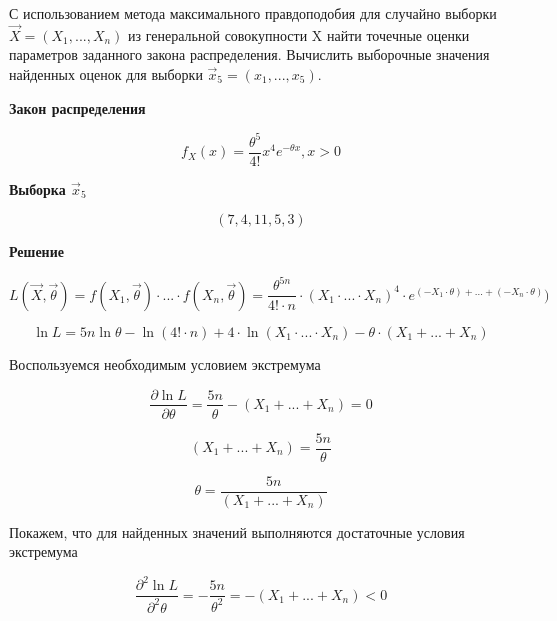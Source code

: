 \documentclass[12pt, a4paper]{report}
\begin{document}
	\hspace{1cm} С использованием метода максимального правдоподобия для случайно выборки $\vec{X} = (X_1, ..., X_n)$ из генеральной совокупности X найти точечные оценки параметров заданного закона распределения. Вычислить выборочные значения найденных оценок для выборки $\vec{x}_5 = (x_1, ..., x_5)$.
	
	\vspace{0.5cm}
	\textbf{Закон распределения}
	
	\begin{equation*}
	f_X(x) = \frac{\theta^5}{4!}  x^4  e^{-\theta x}, x > 0
	\end{equation*}
	
	\textbf{Выборка $\vec x_5$}
	
	\begin{equation*}
	(7, 4, 11, 5, 3)
	\end{equation*}
	
	\vspace{0.2cm}
	\textbf{Решение}
	
	\begin{equation*}
	L(\vec{X}, \vec{\theta}) = f(X_1, \vec{\theta}) \cdot ... \cdot f(X_n, \vec{\theta}) = \frac{\theta^{5n}}{4! \cdot n} \cdot (X_1 \cdot ... \cdot X_n)^4 \cdot e^{(-X_1 \cdot \theta)  + ... +(-X_n \cdot \theta) } )
	\end{equation*}
	
	\begin{equation*}
	\ln{L} = 5n \ln{\theta} - \ln{(4! \cdot n)} +  4 \cdot \ln{(X_1 \cdot ... \cdot X_n)} - \theta \cdot (X_1 + ... + X_n)
	\end{equation*}
	
	Воспользуемся необходимым условием экстремума
	
	\begin{equation*}
	\frac{\partial \ln L}{\partial \theta} = \frac{5n}{\theta} - (X_1 + ... + X_n) = 0
	\end{equation*}
	
	\begin{equation*}
	(X_1 + ... + X_n) = \frac{5n}{\theta}
	\end{equation*}
	
	\begin{equation*}
	\theta = \frac{5n}{(X_1 + ... + X_n)}
	\end{equation*}
	
	
	Покажем, что для найденных значений выполняются достаточные условия экстремума
	
	\begin{equation*}
	\frac{\partial^2 \ln L}{\partial^2 \theta} = -\frac{5n}{\theta^2} = -(X_1 + ... + X_n) < 0
	\end{equation*}
	
\end{document}
